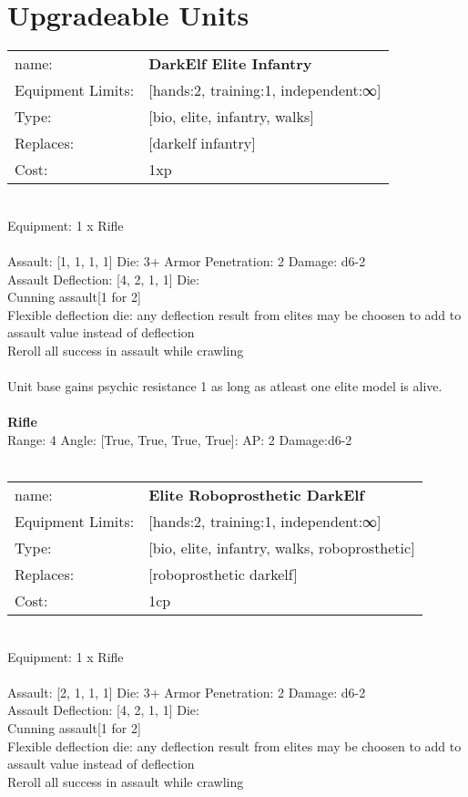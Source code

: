 \pagebreak\section{Upgradeable Units}\noindent
\begin{tabular}{ll}
name: &{\bf DarkElf Elite Infantry } \\
Equipment Limits: &[hands:2, training:1, independent:∞] \\
Type: &[bio, elite, infantry, walks] \\
Replaces: &[darkelf infantry] \\
Cost: & 1xp\\
\end{tabular}
\ \\
Equipment: 1 x Rifle \\
\ \\
Assault: [1, 1, 1, 1] Die: 3+ Armor Penetration: 2 Damage: d6-2 \\
Assault Deflection: [4, 2, 1, 1] Die: \\
\indent Cunning assault[1 for 2]\\ 
Flexible deflection die: any deflection result from elites may be choosen to add to assault value instead of deflection\\ 
Reroll all success in assault while crawling\\ 
 
\ \\
Unit base gains psychic resistance 1 as long as atleast one elite model is alive.\\ 

\ \\
{\bf Rifle } \\



Range: 4  Angle: [True, True, True, True]: AP: 2 Damage:d6-2 \\




 
\ \\

\noindent
\begin{tabular}{ll}
name: &{\bf Elite Roboprosthetic DarkElf } \\
Equipment Limits: &[hands:2, training:1, independent:∞] \\
Type: &[bio, elite, infantry, walks, roboprosthetic] \\
Replaces: &[roboprosthetic darkelf] \\
Cost: & 1cp\\
\end{tabular}
\ \\
Equipment: 1 x Rifle \\
\ \\
Assault: [2, 1, 1, 1] Die: 3+ Armor Penetration: 2 Damage: d6-2 \\
Assault Deflection: [4, 2, 1, 1] Die: \\
\indent Cunning assault[1 for 2]\\ 
Flexible deflection die: any deflection result from elites may be choosen to add to assault value instead of deflection\\ 
Reroll all success in assault while crawling\\ 
 
